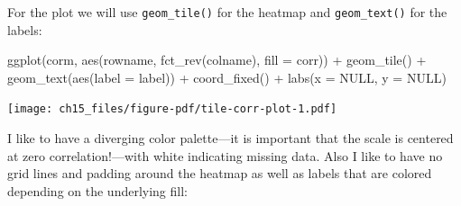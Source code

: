 \documentclass[
  letterpaper,
]{scrbook}
\newenvironment{Shaded}{\begin{snugshade}}{\end{snugshade}}
\newcommand{\AttributeTok}[1]{\textcolor[rgb]{0.40,0.45,0.13}{#1}}
\newcommand{\ConstantTok}[1]{\textcolor[rgb]{0.56,0.35,0.01}{#1}}
\newcommand{\FunctionTok}[1]{\textcolor[rgb]{0.28,0.35,0.67}{#1}}
\newcommand{\NormalTok}[1]{\textcolor[rgb]{0.00,0.23,0.31}{#1}}
\newcommand{\SpecialCharTok}[1]{\textcolor[rgb]{0.37,0.37,0.37}{#1}}
\begin{document}
For the plot we will use \texttt{geom\_tile()} for the heatmap and
\texttt{geom\_text()} for the labels:

\begin{Shaded}
\begin{Highlighting}[]
\FunctionTok{ggplot}\NormalTok{(corm, }\FunctionTok{aes}\NormalTok{(rowname, }\FunctionTok{fct\_rev}\NormalTok{(colname),}
                 \AttributeTok{fill =}\NormalTok{ corr)) }\SpecialCharTok{+}
  \FunctionTok{geom\_tile}\NormalTok{() }\SpecialCharTok{+}
  \FunctionTok{geom\_text}\NormalTok{(}\FunctionTok{aes}\NormalTok{(}\AttributeTok{label =}\NormalTok{ label)) }\SpecialCharTok{+}
  \FunctionTok{coord\_fixed}\NormalTok{() }\SpecialCharTok{+}
  \FunctionTok{labs}\NormalTok{(}\AttributeTok{x =} \ConstantTok{NULL}\NormalTok{, }\AttributeTok{y =} \ConstantTok{NULL}\NormalTok{)}
\end{Highlighting}
\end{Shaded}

\texttt{[image: ch15\_files/figure-pdf/tile-corr-plot-1.pdf]}

I like to have a diverging color palette---it is important that the
scale is centered at zero correlation!---with white indicating missing
data. Also I like to have no grid lines and padding around the heatmap
as well as labels that are colored depending on the underlying fill:
\end{document}
